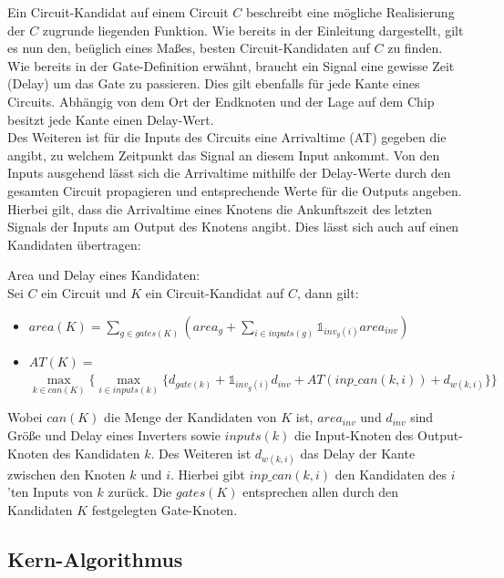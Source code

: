 \documentclass[11pt, a4paper, german]{article}
\begin{document}
Ein Circuit-Kandidat auf einem Circuit $C$ beschreibt eine mögliche Realisierung der $C$ zugrunde liegenden Funktion.  Wie bereits in der Einleitung dargestellt, gilt es nun den, be\"uglich eines Ma{\ss}es, besten Circuit-Kandidaten auf $C$ zu finden.\\

Wie bereits in der Gate-Definition erwähnt, braucht ein Signal eine gewisse Zeit (Delay) um das Gate zu passieren. Dies gilt ebenfalls für jede Kante eines Circuits. Abhängig von dem Ort der Endknoten und der Lage auf dem Chip besitzt jede Kante einen Delay-Wert. \\
Des Weiteren ist für die Inputs des Circuits eine Arrivaltime (AT) gegeben die angibt, zu welchem Zeitpunkt das Signal an diesem Input ankommt. Von den Inputs ausgehend lässt sich die Arrivaltime mithilfe der Delay-Werte durch den gesamten Circuit propagieren und entsprechende Werte für die Outputs angeben. Hierbei gilt, dass die Arrivaltime eines Knotens die Ankunftszeit des letzten Signals der Inputs am Output des Knotens angibt. Dies lässt sich auch auf einen Kandidaten übertragen:

\begin{definition}{Area und Delay eines Kandidaten:}\\
\label{def:area_delay}
Sei $C$ ein Circuit und $K$ ein Circuit-Kandidat auf $C$, dann gilt: \\
\begin{itemize}
\item $area(K) = \sum_{g \in gates(K)} (area_g + \sum_{i \in inputs(g)} \mathbb{1}_{inv_g(i)} area_{inv})$ 
\item $AT(K) = $\\$  \max\limits_{k \in can(K)} \{\max\limits_{i \in inputs(k)} \{   d_{gate(k)} + \mathbb{1}_{inv_g(i)} d_{inv} + AT(inp\_can(k,i)) + d_{w(k,i)} \} \}$ 
\end{itemize}
Wobei $can(K)$ die Menge der Kandidaten von $K$ ist, $area_{inv}$ und $d_{inv}$ sind Größe und Delay eines Inverters sowie $inputs(k)$ die Input-Knoten des Output-Knoten des Kandidaten $k$. Des Weiteren ist $d_{w(k,i)} $ das Delay der Kante zwischen den Knoten $k$ und $i$. Hierbei gibt $inp\_can(k,i)$ den Kandidaten des $i$'ten Inputs von $k$ zurück. 
Die $gates(K)$ entsprechen allen durch den Kandidaten $K$ festgelegten Gate-Knoten. 

\end{definition}

\subsection{Kern-Algorithmus}
\label{subsec:kern_algorithmus}
\end{document}
